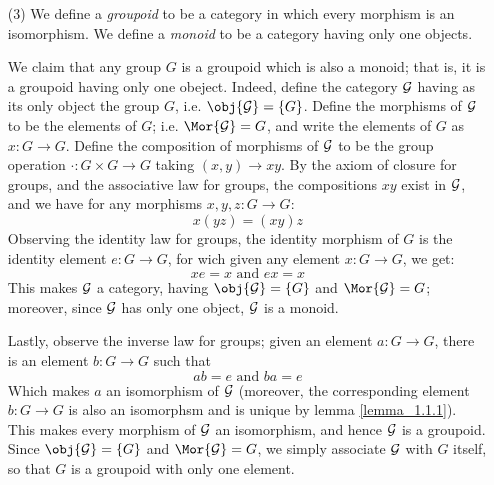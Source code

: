 \begin{example}
\begin{enumerate}
     \item[(3)] We define a \textit{groupoid} to be a category in
       which every morphism is an isomorphism. We define a
       \textit{monoid} to be a category having only one objects.

       We claim that any group $G$ is a groupoid which is also a
       monoid; that is, it is a groupoid having only one obeject.
       Indeed, define the category $\mathcal{G}$ having as its only object the group
       $G$, i.e. $\obj{\Gc}=\{G\}$. Define the morphisms of $\mathcal{G}$ to
       be the elements of $G$; i.e. $\Mor{\Gc}=G$, and write the
       elements of $G$ as $x:G \xrightarrow{} G$. Define the
       composition of morphisms of $\mathcal{G}$ to be the group operation
       $\cdot:G \times G \xrightarrow{} G$ taking $(x,y)
       \xrightarrow{} xy$. By the axiom of closure for groups, and the
       associative law for groups, the compositions $xy$ exist in
       $\mathcal{G}$, and we have for any morphisms $x,y,z:G \xrightarrow{}
       G$:
       \begin{equation*}
         x(yz)=(xy)z
       \end{equation*}
       Observing the identity law for groups, the identity morphism of $G$ is the
       identity element $e:G
       \xrightarrow{} G$, for wich given any element $x:G
       \xrightarrow{} G$, we get:
       \begin{equation*}
         xe=x \text{ and } ex=x
       \end{equation*}
       This makes $\mathcal{G}$ a category, having  $\obj{\Gc}=\{G\}$ and
       $\Mor{\Gc}=G$; moreover, since $\mathcal{G}$ has only one object, $\mathcal{G}$
       is a monoid.

       Lastly, observe the inverse law for groups; given an element
       $a:G \xrightarrow{} G$, there is an element $b:G \xrightarrow{}
       G$ such that
       \begin{equation*}
         ab=e \text{ and } ba=e
       \end{equation*}
       Which makes $a$ an isomorphism of $\mathcal{G}$ (moreover, the
       corresponding element $b:G \xrightarrow{} G$ is also an
       isomorphsm and is unique by lemma \ref{lemma_1.1.1}). This
       makes every morphism of $\mathcal{G}$ an isomorphism, and hence $\mathcal{G}$ is
       a groupoid. Since $\obj{\Gc}=\{G\}$ and $\Mor{\Gc}=G$, we
       simply associate $\mathcal{G}$ with $G$ itself, so that $G$ is a
       groupoid with only one element.
  \end{enumerate}
\end{example}
